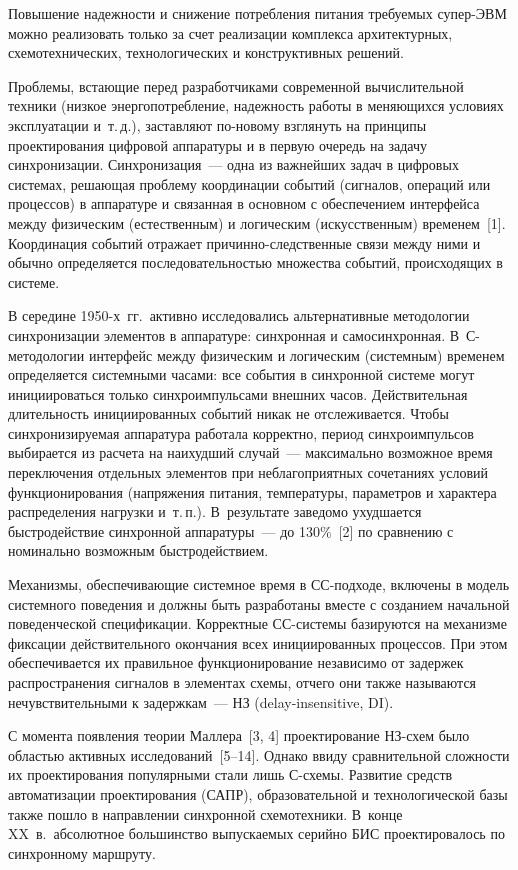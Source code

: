 \begin{multicols}{2}
Повышение надежности и снижение 
потребления питания требуемых су\-пер-ЭВМ можно реализовать только за счет реализации 
комплекса архитектурных, схемотехнических, технологических и конструктивных решений.
       
       Проблемы, встающие перед разработчиками современной вычислительной техники 
(низкое энергопотребление, надежность работы в меняющихся условиях эксплуатации 
и~т.\,д.), заставляют по-но\-во\-му взглянуть на принципы проектирования циф\-ро\-вой 
аппаратуры
и в первую очередь на задачу синхронизации. Синхронизация~--- одна из важнейших задач в 
цифровых системах, решающая проблему координации событий (сигналов, операций или 
процессов) в аппаратуре и связанная в основном с обеспечением интерфейса между 
физическим (естественным) и логическим (искусственным) временем~[1]. Координация 
событий отражает при\-чин\-но-след\-ст\-вен\-ные связи между ними и обычно определяется 
последовательностью мно\-жества событий, происходящих в системе.
       
       В середине 1950-х~гг.\ активно исследовались 
альтернативные методологии синхронизации элементов в аппаратуре: синхронная  и 
самосинхронная. В~С-ме\-то\-до\-ло\-гии интерфейс между физическим и 
логическим (сис\-тем\-ным) временем определяется сис\-тем\-ны\-ми часами: все события в 
синхронной сис\-те\-ме могут инициироваться только синхроимпульсами внешних часов. 
Действительная длительность инициированных событий никак не отслеживается. Чтобы 
синхронизируемая аппаратура работала корректно, период синхроимпульсов выбирается из 
расчета на наихудший случай~--- максимально возможное время переключения отдельных 
элементов при неблагоприятных сочетаниях условий функционирования (напряжения 
питания, температуры, параметров и характера распределения нагрузки и~т.\,п.). 
В~результате заведомо ухудшается быстродействие синхронной аппаратуры~--- до 
130\%~[2] по сравнению с номинально возможным быстродействием.
       
       Механизмы, обеспечивающие системное время в СС-под\-хо\-де, включены в модель 
системного поведения и должны быть разработаны вместе с созданием начальной 
поведенческой спецификации. Корректные СС-сис\-те\-мы базируются на механизме 
фиксации действительного окончания всех инициированных процессов. При этом 
обеспечивается их правильное функционирование независимо от задержек распространения 
сигналов в элементах схемы, отчего они также называются нечувствительными к 
задержкам~--- НЗ (delay-insensitive, DI).
       
       С момента появления теории Маллера~[3, 4] проектирование НЗ-схем было 
областью активных исследований~[5--14]. Однако ввиду сравнительной сложности их 
проектирования популярными стали лишь С-схе\-мы. Развитие средств 
автоматизации проектирования (САПР), образовательной и технологической базы также 
пошло в направлении синхронной схемотехники. В~конце XX~в.\ абсолютное большинство 
выпускаемых серийно БИС проектировалось по синхронному маршруту. 
       

\end{multicols}
